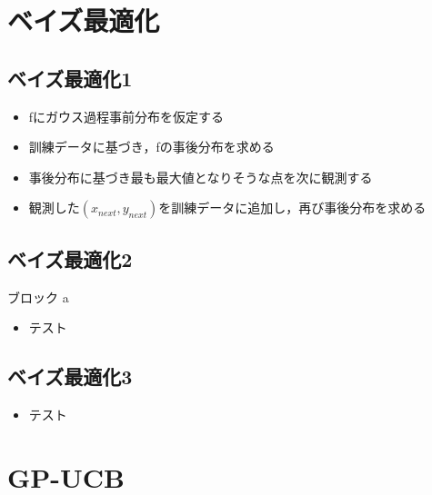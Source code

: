 \documentclass[dvipdfmx, 10.5pt]{beamer}
\begin{document}
\section{ベイズ最適化}


\subsection{ベイズ最適化1}
\begin{frame}{\insertsubsection}
	\begin{itemize}
		\item fにガウス過程事前分布を仮定する
		\item 訓練データに基づき，fの事後分布を求める
		\item 事後分布に基づき\alert{最も最大値となりそうな点}を次に観測する
		\item 観測した$(x_{next}, y_{next})$を訓練データに追加し，再び事後分布を求める
	\end{itemize}

\end{frame}


\subsection{ベイズ最適化2}
\begin{frame}{\insertsubsection}
	\begin{block}{ブロック}
		a
	\end{block}
	\begin{itemize}
		\item テスト
	\end{itemize}
\end{frame}

\subsection{ベイズ最適化3}
\begin{frame}{\insertsubsection}
	\begin{itemize}
		\item テスト
	\end{itemize}

\end{frame}


\section{GP-UCB}
\end{document}
